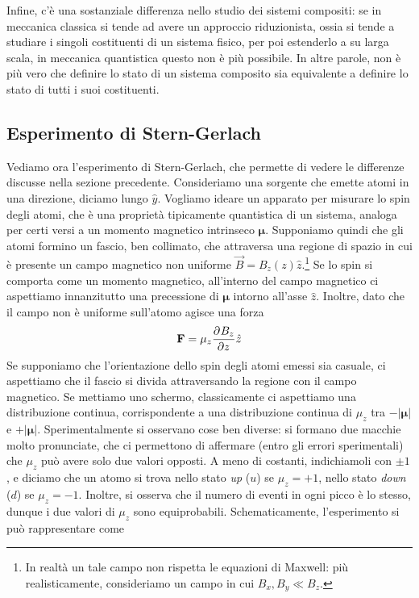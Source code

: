 \documentclass[a4paper, 11pt]{article}
\begin{document}
	Infine, c'è una sostanziale differenza nello studio dei sistemi compositi: se in meccanica classica si tende ad avere un approccio riduzionista, ossia si tende a studiare i singoli costituenti di un sistema fisico, per poi estenderlo a su larga scala, in meccanica quantistica questo non è più possibile. In altre parole, non è più vero che definire lo stato di un sistema composito sia equivalente a definire lo stato di tutti i suoi costituenti.
	\subsection{Esperimento di Stern-Gerlach}
	Vediamo ora l'esperimento di Stern-Gerlach, che permette di vedere le differenze discusse nella sezione precedente. Consideriamo una sorgente che emette atomi in una direzione, diciamo lungo $\hat{y}$. Vogliamo ideare un apparato per misurare lo spin degli atomi, che è una proprietà tipicamente quantistica di un sistema, analoga per certi versi a un momento magnetico intrinseco $\bm{\mu}$. Supponiamo quindi che gli atomi formino un fascio, ben collimato, che attraversa una regione di spazio in cui è presente un campo magnetico non uniforme $\vec{B}=B_z(z)\hat{z}$.\footnote{In realtà un tale campo non rispetta le equazioni di Maxwell: più realisticamente, consideriamo un campo in cui $B_x,B_y\ll B_z$.} Se lo spin si comporta come un momento magnetico, all'interno del campo magnetico ci aspettiamo innanzitutto una precessione di $\bm{\mu}$ intorno all'asse $\hat{z}$. Inoltre, dato che il campo non è uniforme sull'atomo agisce una forza
	\[\mathbf{F}=\mu_z\dfrac{\partial ^{}B_z}{\partial {z}^{}}\hat{z}\]
	Se supponiamo che l'orientazione dello spin degli atomi emessi sia casuale, ci aspettiamo che il fascio si divida attraversando la regione con il campo magnetico. Se mettiamo uno schermo, classicamente ci aspettiamo una distribuzione continua, corrispondente a una distribuzione continua di $\mu_z$ tra $-|\bm\mu|$ e $+|\bm\mu|$. Sperimentalmente si osservano cose ben diverse: si formano due macchie molto pronunciate, che ci permettono di affermare (entro gli errori sperimentali) che $\mu_z$ può avere solo due valori opposti. A meno di costanti, indichiamoli con $\pm1$, e diciamo che un atomo si trova nello stato \textit{up} ($u$) se $\mu_z=+1$, nello stato \textit{down} ($d$) se $\mu_z=-1$. Inoltre, si osserva che il numero di eventi in ogni picco è lo stesso, dunque i due valori di $\mu_z$ sono equiprobabili. Schematicamente, l'esperimento si può rappresentare come
	\begin{figure}[h!]
		\centering
	\end{figure}
\end{document}
